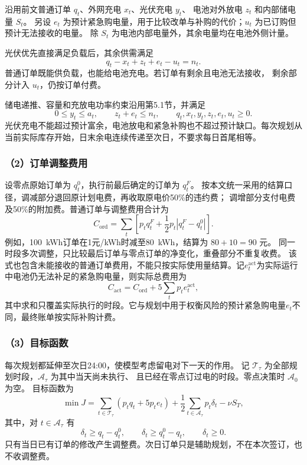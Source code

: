 沿用前文普通订单 $q_t$、外网充电 $x_t$、光伏充电 $y_t$、
电池对外放电 $z_t$ 和内部储电量 $S_t$。
另设 $e_t$ 为预计紧急购电量，用于比较改单与补购的代价；$u_t$ 为已订购但预计无法接收的电量。
除 $S_t$ 为电池内部电量外，其余电量均在电池外侧计量。



光伏优先直接满足负载后，其余供需满足
\begin{equation}
q_t-x_t+z_t+e_t-u_t=n_t.
\end{equation}
普通订单既能供负载，也能给电池充电。若订单有剩余且电池无法接收，
剩余部分计入 $u_t$，仍按订单付费。

储电递推、容量和充放电功率约束沿用第5.1节，并满足
\begin{equation}
0\le y_t\le a_t,\qquad z_t+e_t\le n_t,\qquad q_t,x_t,y_t,z_t,e_t,u_t\ge0.
\end{equation}
光伏充电不能超过预计富余，电池放电和紧急补购也不超过预计缺口。每次规划从当前实际库存开始，日末余电连续传递至次日，不要求每日首尾相等。

\subsubsection*{（2）订单调整费用}

设零点原始订单为 $q_t^0$，执行前最后确定的订单为 $q_t^F$。
按本文统一采用的结算口径，调减部分退回原计划电费，再收取原电价50\%的违约费；
调增部分支付电费及50\%的附加费。普通订单与调整费用合计为
\begin{equation}
C_{\mathrm{ord}}=\sum_t\left[p_tq_t^F+\frac12p_t|q_t^F-q_t^0|\right].
\end{equation}
例如，100~kWh订单在1元/kWh时减至80~kWh，结算为 $80+10=90$ 元。
同一时段多次调整，只比较最后订单与零点订单的净变化，重叠部分不重复收费。
该式也包含未能接收的普通订单费用，不能只按实际使用量结算。记$e_t^{\mathrm{act}}$为实际运行中电池仍无法补足的紧急购电量，则实际总费用为
\[
C_{\mathrm{act}}=C_{\mathrm{ord}}+5\sum_t p_t e_t^{\mathrm{act}},
\]
其中求和只覆盖实际执行的时段。它与规划中用于权衡风险的预计紧急购电量$e_t$不同，最终账单按实际补购计费。

\subsubsection*{（3）目标函数}

每次规划都延伸至次日24:00，使模型考虑留电对下一天的作用。
记 $\mathcal T_{\tau}$ 为全部规划时段，$\mathcal A_{\tau}$ 为其中当天尚未执行、
且已经在零点订过电的时段。零点决策时 $\mathcal A_0$ 为空。
目标函数为
\begin{equation}
\min J=\sum_{t\in\mathcal T_{\tau}}(p_tq_t+5p_te_t)
+\frac12\sum_{t\in\mathcal A_{\tau}}p_t\delta_t-\nu S_T,
\end{equation}
其中，对 $t\in\mathcal A_{\tau}$ 有
\begin{equation}
\delta_t\geq q_t-q_t^0,\qquad
\delta_t\geq q_t^0-q_t,\qquad\delta_t\geq0.
\end{equation}
只有当日已有订单的修改产生调整费。次日订单只是辅助规划，不在本次签订，也不收调整费。


